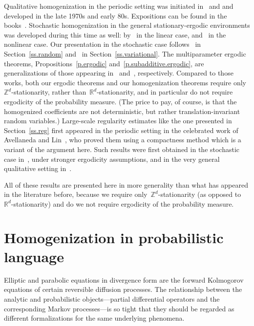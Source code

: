 \documentclass[11pt]{article} %
\numberwithin{equation}{section}
\theoremstyle{definition}
\newcommand*{\Zd}{\ensuremath{\mathbb{Z}^d}}
\newcommand*{\Rd}{\ensuremath{\mathbb{R}^d}}
\begin{document}
Qualitative homogenization in the periodic setting was initiated in~\cite{DGS} and and developed in the late 1970s and early 80s. Expositions can be found in the books~\cite{BLP,JKO,T}. Stochastic homogenization in the general stationary-ergodic environments was developed during this time as well: by~\cite{PV,Koz} in the linear case, and~\cite{DM1,DM2} in the nonlinear case. 
Our presentation in the stochastic case follows~\cite{PV} in Section~\ref{ss.random} and~\cite{DM1,DM2} in Section~\ref{ss.variational}. 
The multiparameter ergodic theorems, Propositions~\ref{p.ergodic} and~\ref{p.subadditive.ergodic}, are generalizations of those appearing in~\cite{Becker} and~\cite{Akc}, respectively. Compared to those works, both our ergodic theorems and our homogenization theorems require only~$\Zd$-stationarity, rather than~$\Rd$-stationarity, and in particular do not require ergodicity of the probability measure. (The price to pay, of course, is that the homogenized coefficients are not deterministic, but rather translation-invariant random variables.)
Large-scale regularity estimates like the one presented in Section~\ref{ss.reg} first appeared in the periodic setting in the celebrated work of Avellaneda and Lin~\cite{AL1,AL2}, who proved them using a compactness method which is a variant of the argument here. Such results were first obtained in the stochastic case in~\cite{AS}, under stronger ergodicity assumptions, and in the very general qualitative setting in~\cite{GNO3}.

\smallskip

All of these results are presented here in more generality than what has appeared in the literature before, because we require only~$\Zd$-stationarity (as opposed to~$\Rd$-stationarity) and do we not require ergodicity of the probability measure. 




\section{Homogenization in probabilistic language}
\label{s.probability}

Elliptic and parabolic equations in divergence form are the forward Kolmogorov equations of certain reversible diffusion processes. The relationship between the analytic and probabilistic objects---partial differential operators and the corresponding Markov processes---is so tight that they should be regarded as different formalizations for the same underlying phenomena. 
\end{document}
